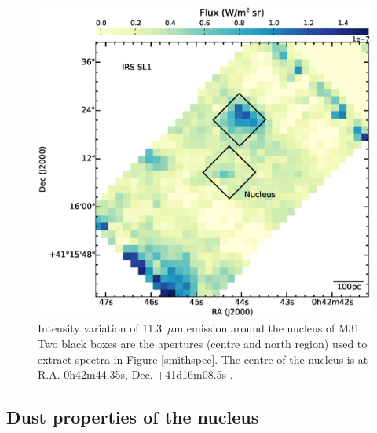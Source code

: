 %
\begin{figure}
\centering
\includegraphics[width = 8 cm]{./nuc11_3.eps}
\caption{ Intensity variation of 11.3~$\mu$m emission around the nucleus of M31. 
Two black boxes are the apertures (centre and north region) used to extract spectra in Figure \ref{smithspec}. 
The centre of the nucleus is at R.A. 0h42m44.35s, Dec. +41d16m08.5s \citep{NucleusREF}.}
\label{nuc11}
\end{figure}

\subsection{Dust properties of the nucleus}
\label{sect:nucleus}

%
%
%

